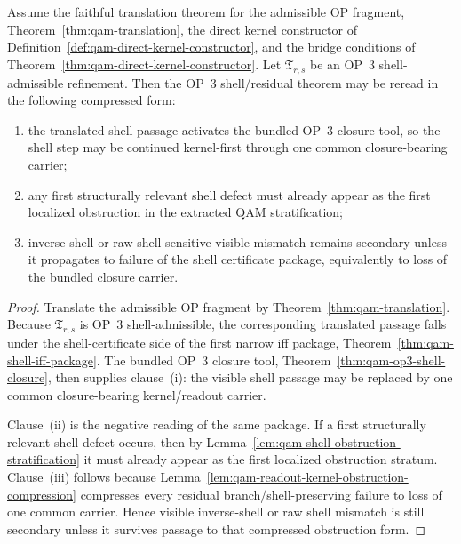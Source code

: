 \begin{proposition}
\label{prop:op3-shell-reread-through-qam-tools}
Assume the faithful translation theorem for the admissible OP fragment, Theorem~\ref{thm:qam-translation}, the direct kernel constructor of Definition~\ref{def:qam-direct-kernel-constructor}, and the bridge conditions of Theorem~\ref{thm:qam-direct-kernel-constructor}. Let $\mathfrak{T}_{r,s}$ be an OP~3 shell-admissible refinement. Then the OP~3 shell/residual theorem may be reread in the following compressed form:
\begin{enumerate}[leftmargin=2em,label=(\roman*)]
\item the translated shell passage activates the bundled OP~3 closure tool, so the shell step may be continued kernel-first through one common closure-bearing carrier;
\item any first structurally relevant shell defect must already appear as the first localized obstruction in the extracted QAM stratification;
\item inverse-shell or raw shell-sensitive visible mismatch remains secondary unless it propagates to failure of the shell certificate package, equivalently to loss of the bundled closure carrier.
\end{enumerate}
\end{proposition}

\begin{proof}
Translate the admissible OP fragment by Theorem~\ref{thm:qam-translation}. Because $\mathfrak{T}_{r,s}$ is OP~3 shell-admissible, the corresponding translated passage falls under the shell-certificate side of the first narrow iff package, Theorem~\ref{thm:qam-shell-iff-package}. The bundled OP~3 closure tool, Theorem~\ref{thm:qam-op3-shell-closure}, then supplies clause~(i): the visible shell passage may be replaced by one common closure-bearing kernel/readout carrier.

Clause~(ii) is the negative reading of the same package. If a first structurally relevant shell defect occurs, then by Lemma~\ref{lem:qam-shell-obstruction-stratification} it must already appear as the first localized obstruction stratum. Clause~(iii) follows because Lemma~\ref{lem:qam-readout-kernel-obstruction-compression} compresses every residual branch/shell-preserving failure to loss of one common carrier. Hence visible inverse-shell or raw shell mismatch is still secondary unless it survives passage to that compressed obstruction form.
\end{proof}

